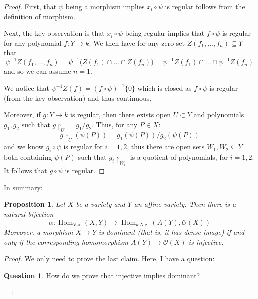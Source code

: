 \documentclass[12pt]{article}
\theoremstyle{plain}
\newtheorem{proposition}[thm]{Proposition}
\theoremstyle{definition}
\newtheorem{question}[thm]{Question}
\newcommand{\call}[1]{\mathcal{#1}}
\newcommand{\lto}{\longrightarrow}
\begin{document}
\begin{proof}
First, that $\psi$ being a morphism implies $x_i \circ \psi$ is regular follows from the definition of morphism.

Next, the key observation is that $x_i \circ \psi$ being regular implies that $f \circ \psi$ is regular for any polynomial $f: Y \lto k$. We then have for any zero set $Z(f_1,...,f_n) \subseteq Y$ that
\begin{equation}
\psi^{-1}Z(f_1,...,f_n) = \psi^{-1}\big(Z(f_1)\cap...\cap Z(f_n)\big) = \psi^{-1}Z(f_1)\cap ... \cap \psi^{-1}Z(f_n)
\end{equation}
and so we can assume $n = 1$.

We notice that $\psi^{-1}Z(f) = (f\circ \psi)^{-1}\lbrace 0 \rbrace$ which is closed as $f\circ\psi$ is regular (from the key observation) and thus continuous.

Moreover, if $g: Y \lto k$ is regular, then there exists open $U \subset Y$ and polynomials $g_1,g_2$ such that $g\restriction_{U} = g_1/g_2$. Thus, for any $P \in X$:
\begin{equation}
g\restriction_{U}(\psi(P)) = g_1(\psi(P))/g_2(\psi(P))
\end{equation}
and we know $g_i \circ \psi$ is regular for $i = 1,2$, thus there are open sets $W_1,W_2 \subseteq Y$ both containing $\psi(P)$ such that $g_i\restriction_{W_i}$ is a quotient of polynomials, for $i = 1,2$. It follows that $g \circ \psi$ is regular.
\end{proof}



In summary:
\begin{proposition}
\label{prop:adjunction}
Let $X$ be a variety and $Y$ an affine variety. Then there is a natural bijection
\[\alpha: \operatorname{Hom}_{\operatorname{Var}}(X,Y) \lto \operatorname{Hom}_{k\operatorname{Alg}}(A(Y),\call{O}(X))\]
Moreover, a morphism $X \lto Y$ is \emph{dominant} (that is, it has dense image) if and only if the corresponding homomorphism $A(Y) \lto \call{O}(X)$ is injective.
\end{proposition}
\begin{proof}
We only need to prove the last claim. Here, I have a question:
\begin{question}
	How do we prove that injective implies dominant?
	\end{question}
\end{proof}
%
%
%
%
%
\end{document}
